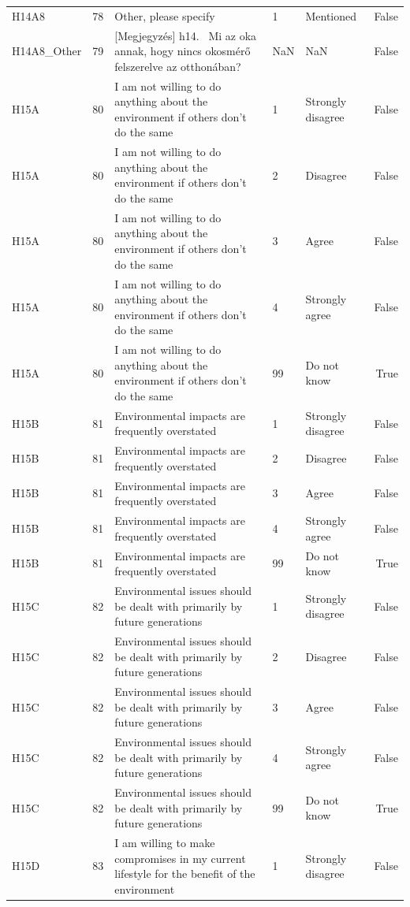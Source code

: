 \begin{tabular}{lrlllr}
H14A8 & 78 & Other, please specify & 1 & Mentioned & False \\
H14A8_Other & 79 & [Megjegyzés]      h14.  Mi az oka annak, hogy nincs okosmérő felszerelve az otthonában? & NaN & NaN & False \\
H15A & 80 & I am not willing to do anything about the environment if others don’t do the same & 1 & Strongly disagree & False \\
H15A & 80 & I am not willing to do anything about the environment if others don’t do the same & 2 & Disagree & False \\
H15A & 80 & I am not willing to do anything about the environment if others don’t do the same & 3 & Agree & False \\
H15A & 80 & I am not willing to do anything about the environment if others don’t do the same & 4 & Strongly agree & False \\
H15A & 80 & I am not willing to do anything about the environment if others don’t do the same & 99 & Do not know & True \\
H15B & 81 & Environmental impacts are frequently overstated & 1 & Strongly disagree & False \\
H15B & 81 & Environmental impacts are frequently overstated & 2 & Disagree & False \\
H15B & 81 & Environmental impacts are frequently overstated & 3 & Agree & False \\
H15B & 81 & Environmental impacts are frequently overstated & 4 & Strongly agree & False \\
H15B & 81 & Environmental impacts are frequently overstated & 99 & Do not know & True \\
H15C & 82 & Environmental issues should be dealt with primarily by future generations & 1 & Strongly disagree & False \\
H15C & 82 & Environmental issues should be dealt with primarily by future generations & 2 & Disagree & False \\
H15C & 82 & Environmental issues should be dealt with primarily by future generations & 3 & Agree & False \\
H15C & 82 & Environmental issues should be dealt with primarily by future generations & 4 & Strongly agree & False \\
H15C & 82 & Environmental issues should be dealt with primarily by future generations & 99 & Do not know & True \\
H15D & 83 & I am willing to make compromises in my current lifestyle for the benefit of the environment & 1 & Strongly disagree & False \\

\end{tabular}

